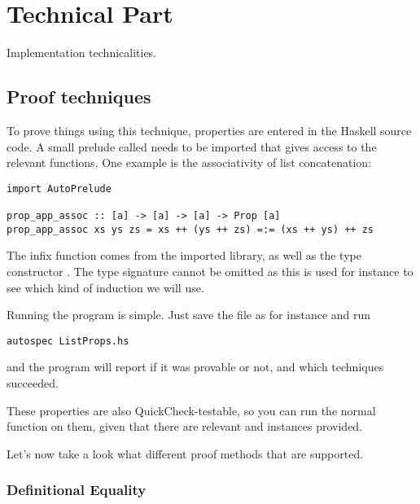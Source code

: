 \chapter{Technical Part}

Implementation technicalities.





\section{Proof techniques}


To prove things using this technique, properties are entered in the
Haskell source code. A small prelude called  needs to
be imported that gives access to the relevant functions. One example
is the associativity of list concatenation:

\begin{verbatim}
import AutoPrelude

prop_app_assoc :: [a] -> [a] -> [a] -> Prop [a]
prop_app_assoc xs ys zs = xs ++ (ys ++ zs) =:= (xs ++ ys) ++ zs
\end{verbatim}

The infix function \hs{=:=} comes from the imported library, as well
as the type constructor . The type signature cannot be
omitted as this is used for instance to see which kind of induction we
will use.

Running the program is simple. Just save the file as for instance
 and run

\begin{verbatim}
autospec ListProps.hs
\end{verbatim}

and the program will report if it was provable or not, and which
techniques succeeded.

These properties are also QuickCheck-testable, so you can run the
normal  function on them, given that there are
relevant  and  instances provided.

Let's now take a look what different proof methods that are supported.

\subsection{Definitional Equality}

